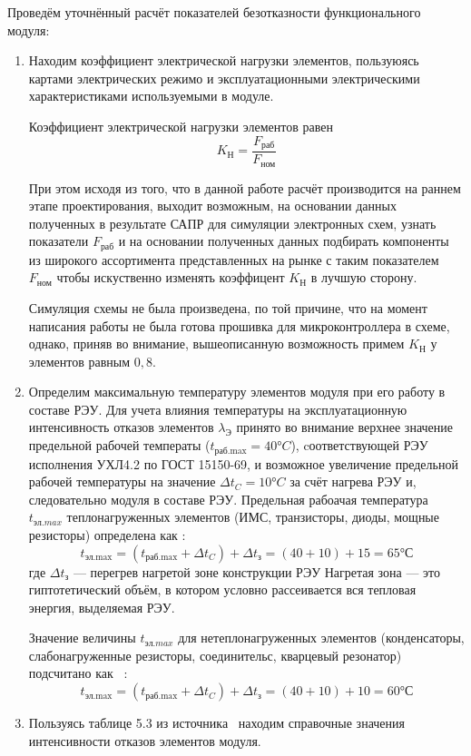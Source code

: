 Проведём уточнённый расчёт показателей безотказности функционального модуля:
\begin{enumerate}
\item Находим коэффициент электрической нагрузки элементов, пользуюясь
картами электрических режимо и эксплуатационными электрическими
характеристиками используемыми в модуле.

Коэффициент электрической нагрузки элементов равен
\begin{equation}
  K_{\text{Н}} = \frac{F_{\text{раб}}}{F_{\text{ном}}}
\end{equation}

При этом исходя из того, что в данной работе расчёт производится на
раннем этапе проектирования, выходит возможным, на
основании данных полученных в результате САПР для симуляции
электронных схем, узнать показатели $F_{\text{раб}}$ и
на основании полученных данных подбирать компоненты из широкого
ассортимента представленных на рынке с таким показателем
$F_{\text{ном}}$ чтобы искуственно изменять коэффицент
$  K_{\text{Н}}$ в лучшую сторону.

Симуляция схемы не была произведена, по той причине, что на момент
написания работы не была готова прошивка для микроконтроллера в схеме,
однако, приняв во внимание,  вышеописанную возможность примем
$K_{\text{Н}}$ у элементов равным $0,8$.
\item Определим максимальную температуру элементов модуля при его
  работу в составе РЭУ.
  Для учета влияния температуры на эксплуатационную интенсивность
  отказов элементов  $\lambda_{\text{Э}}$ принято во внимание
  верхнее значение предельной рабочей температы
  ($t_{\text{раб.max}}= 40°C$), cоответствующей РЭУ
  исполнения УХЛ4.2 по ГОСТ 15150-69, и возможное увеличение предельной рабочей температуры на значение
  $\Delta t_C = 10°C$ за счёт нагрева РЭУ и, следовательно модуля в составе РЭУ.
  Предельная рабоачая температура $t_{эл.max}$ теплонагруженных
  элементов (ИМС, транзисторы, диоды, мощные резисторы) определена как \cite{Borovikov2010}:
  \begin{equation}
    t_{\text{эл.max}} = (t_{\text{раб.max}} + \Delta t_C) + \Delta t_{\text{з}} = (40 + 10) +15 = 65°С
  \end{equation}
  где $\Delta t_{\text{з}}$ — перегрев нагретой зоне конструкции РЭУ
  Нагретая зона — это гиптотетический объём, в котором условно
  рассеивается вся тепловая энергия, выделяемая РЭУ.

  Значение величины $t_{эл.max}$  для нетеплонагруженных элементов
  (конденсаторы, слабонагруженные резисторы, соединительс, кварцевый резонатор)
  подсчитано как ~\cite{Borovikov2010}:
  \begin{equation}
    t_{\text{эл.max}} = (t_{\text{раб.max}} + \Delta t_C) + \Delta t_{\text{з}} = (40 + 10) +10 = 60°С
  \end{equation}
%
\item Пользуясь таблице 5.3 из источника~\cite{Borovikov2010} находим
  справочные значения интенсивности отказов элементов модуля.


\end{enumerate}
